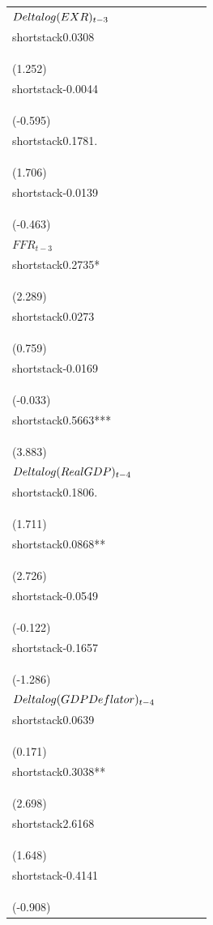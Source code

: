 \begin{table}[H]
\begin{tabular}{l c c c c}
$\\Delta\\log(EXR)_{t-3}$ & \\shortstack{0.0308\\\\(1.252)} & \\shortstack{-0.0044\\\\(-0.595)} & \\shortstack{0.1781.\\\\(1.706)} & \\shortstack{-0.0139\\\\(-0.463)} \\
$FFR_{t-3}$ & \\shortstack{0.2735*\\\\(2.289)} & \\shortstack{0.0273\\\\(0.759)} & \\shortstack{-0.0169\\\\(-0.033)} & \\shortstack{0.5663***\\\\(3.883)} \\
$\\Delta\\log(Real\\ GDP)_{t-4}$ & \\shortstack{0.1806.\\\\(1.711)} & \\shortstack{0.0868**\\\\(2.726)} & \\shortstack{-0.0549\\\\(-0.122)} & \\shortstack{-0.1657\\\\(-1.286)} \\
$\\Delta\\log(GDP\\ Deflator)_{t-4}$ & \\shortstack{0.0639\\\\(0.171)} & \\shortstack{0.3038**\\\\(2.698)} & \\shortstack{2.6168\\\\(1.648)} & \\shortstack{-0.4141\\\\(-0.908)} \\

\end{tabular}
\end{table}
